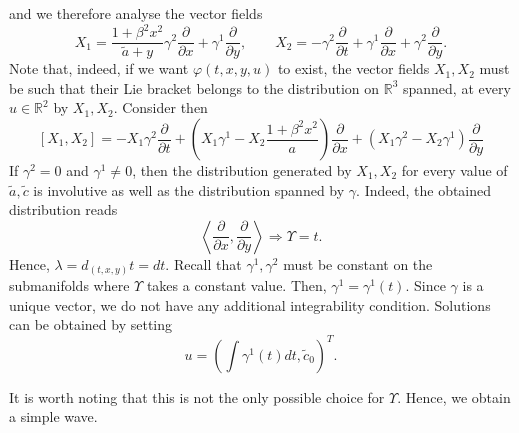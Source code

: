 \documentclass{birkjour}
\theoremstyle{definition}
\theoremstyle{remark}
\numberwithin{equation}{section}
\numberwithin{equation}{section}
\numberwithin{thm}{section}
\numberwithin{equation}{section}
\numberwithin{thm}{section}
\begin{document}
and we therefore analyse the vector fields
$$
X_1=\frac{1+\beta^2x^2}{\widetilde{a}+y}\gamma^2\frac{\partial}{\partial x}+\gamma^1\frac{\partial}{\partial y},\qquad X_2=-\gamma^2\frac{\partial}{\partial t}+\gamma^1\frac{\partial}{\partial x}+\gamma^2\frac{\partial}{\partial y}.
$$
Note that, indeed, if we want $\varphi(t,x,y,u)$ to exist, the vector fields $X_1,X_2$ must be such that their Lie bracket belongs to the distribution on $\mathbb{R}^3$ spanned, at every $u\in \mathbb{R}^2$ by $X_1,X_2$. Consider then
$$
[X_1,X_2]=-X_1\gamma^2\frac{\partial}{\partial t}+\left(X_1\gamma^1-X_2\frac{1+\beta^2x^2}{a}\right)\frac{\partial}{\partial x}+(X_1\gamma^2-X_2\gamma^1)\frac{\partial}{\partial y}
$$
If $\gamma^2=0$ and $\gamma^1\neq 0$, then the distribution generated by $X_1,X_2$ for every value of $\widetilde{a},\widetilde{c}$ is involutive as well as the distribution spanned by $\gamma$. Indeed, the obtained distribution reads
$$
\left\langle \frac{\partial}{\partial x},\frac{\partial}{\partial y}\right\rangle\Rightarrow \Upsilon=t.
$$
Hence, $\lambda=d_{(t,x,y)}t=dt$.  Recall that $\gamma^1,\gamma^2$ must be constant on the submanifolds where $\Upsilon$ takes a constant value. Then, $\gamma^1=\gamma^1(t)$. Since $\gamma$ is a unique vector, we do not have any additional integrability condition. Solutions can be obtained by setting
$$
u=\left(\int \gamma^1(t)dt,\widetilde{c}_0\right)^T.
$$


It is worth noting that this is not the only possible choice for $\Upsilon$. 
Hence, we obtain a simple wave. 
\end{document}
